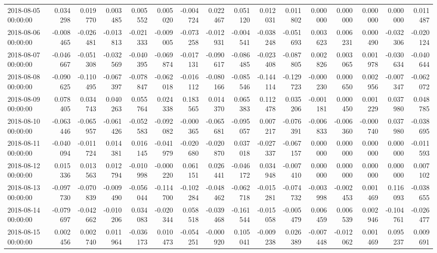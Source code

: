 \begin{tabular}{lrrrrrrrrrrrrrrr}
2018-08-05 00:00:00 & 0.034298 & 0.019770 & 0.003485 & 0.005552 & 0.005020 & -0.004724 & 0.022467 & 0.051120 & 0.012031 & 0.011802 & 0.000000 & 0.000000 & 0.000000 & 0.000000 & 0.011487 \\
2018-08-06 00:00:00 & -0.008465 & -0.026481 & -0.013813 & -0.021333 & -0.009005 & -0.073258 & -0.012931 & -0.004541 & -0.038248 & -0.051693 & 0.003623 & 0.006231 & 0.000490 & -0.032306 & -0.020124 \\
2018-08-07 00:00:00 & -0.046667 & -0.051308 & -0.032569 & -0.040395 & -0.069874 & -0.017131 & -0.090617 & -0.086485 & -0.023408 & -0.087805 & 0.002826 & 0.003065 & 0.001978 & -0.030634 & -0.040644 \\
2018-08-08 00:00:00 & -0.090625 & -0.110495 & -0.067397 & -0.078847 & -0.062018 & -0.016112 & -0.080166 & -0.085546 & -0.144114 & -0.129723 & -0.000230 & 0.000650 & 0.002956 & -0.007347 & -0.062072 \\
2018-08-09 00:00:00 & 0.078405 & 0.034743 & 0.040263 & 0.055764 & 0.024338 & 0.183565 & 0.014370 & 0.065383 & 0.112478 & 0.035206 & -0.001181 & 0.000450 & 0.001229 & 0.037980 & 0.048785 \\
2018-08-10 00:00:00 & -0.063446 & -0.065957 & -0.061426 & -0.052583 & -0.092082 & -0.000365 & -0.065681 & -0.095057 & 0.007217 & -0.076391 & -0.006833 & -0.006360 & -0.000740 & 0.037980 & -0.038695 \\
2018-08-11 00:00:00 & -0.040094 & -0.011724 & 0.014381 & 0.016145 & -0.041979 & -0.020680 & -0.020870 & 0.037018 & -0.027337 & -0.067157 & 0.000000 & 0.000000 & 0.000000 & 0.000000 & -0.011593 \\
2018-08-12 00:00:00 & 0.015336 & 0.013563 & 0.012794 & -0.010998 & -0.000220 & 0.061151 & 0.026441 & -0.046172 & 0.034948 & -0.007410 & 0.000000 & 0.000000 & 0.000000 & 0.000000 & 0.007102 \\
2018-08-13 00:00:00 & -0.097730 & -0.070839 & -0.009490 & -0.056044 & -0.114700 & -0.102284 & -0.048462 & -0.062718 & -0.015281 & -0.074732 & -0.003998 & -0.002453 & 0.001469 & 0.116093 & -0.038655 \\
2018-08-14 00:00:00 & -0.079697 & -0.042662 & -0.010206 & 0.034083 & -0.020344 & 0.058518 & -0.039468 & -0.161544 & -0.015058 & -0.005479 & 0.006459 & 0.006539 & 0.002946 & -0.104761 & -0.026477 \\
2018-08-15 00:00:00 & 0.002456 & 0.002740 & 0.011964 & -0.036173 & 0.010473 & -0.054251 & -0.000920 & 0.105041 & -0.009238 & 0.026389 & -0.007448 & -0.012062 & 0.001469 & 0.095237 & 0.009691 \\

\end{tabular}
